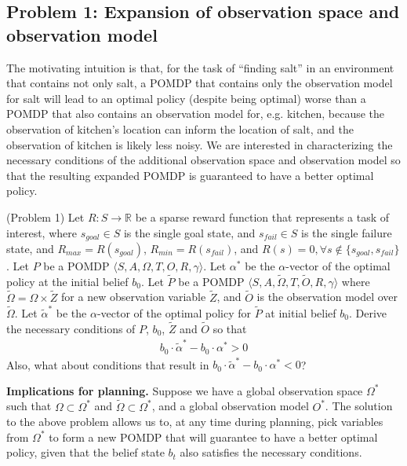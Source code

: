 \documentclass{article}
\newcommand{\td}[1]{\tilde{#1}}
\begin{document}
\subsection{Problem 1: Expansion of observation space and observation model}

The motivating intuition is that, for the task of ``finding salt'' in an environment that contains not only salt, a POMDP that contains only the observation model for salt will lead to an optimal policy (despite being optimal) worse than a POMDP that also contains an observation model for, e.g. kitchen, because the observation of kitchen's location can inform the location of salt, and the observation of kitchen is likely less noisy. We are interested in characterizing the necessary conditions of the additional observation space and observation model so that the resulting expanded POMDP is guaranteed to have a better optimal policy.

\begin{definition}(Problem 1)
Let $R:S\rightarrow \mathbb{R}$ be a sparse reward function that represents a task of interest, where $s_{goal}\in S$ is the single goal state, and $s_{fail}\in S$ is the single failure state, and $R_{max}=R(s_{goal})$, $R_{min}=R(s_{fail})$, and $R(s)=0, \forall s \not\in\{s_{goal},s_{fail}\}$. Let $P$ be a POMDP $\langle S, A, \Omega, T, O, R, \gamma  \rangle$. Let $\alpha^*$ be the $\alpha$-vector of the optimal policy at the initial belief $b_0$. Let $\td{P}$ be a POMDP $\langle S, A, \td{\Omega}, T, \td{O}, R, \gamma  \rangle$ where $\td{\Omega}=\Omega\times\td{Z}$ for a new observation variable $\td{Z}$, and $\td{O}$ is the observation model over $\td{\Omega}$. Let $\td{\alpha}^*$ be the $\alpha$-vector of the optimal policy for $\td{P}$ at initial belief $b_0$. Derive the necessary conditions of $P$, $b_0$, $\td{Z}$ and $\td{O}$ so that
\begin{align}
b_0\cdot \td{\alpha}^* - b_0\cdot \alpha^* > 0
\end{align}
Also, what about conditions that result in $b_0\cdot \td{\alpha}^* - b_0\cdot \alpha^* < 0$?
\end{definition}

\noindent \textbf{Implications for planning.} Suppose we have a global observation space $\Omega^*$ such that $\Omega \subset \Omega^*$ and $\td{\Omega} \subset \Omega^*$, and a global observation model $O^*$. The solution to the above problem allows us to, at any time during planning, pick variables from $\Omega^*$ to form a new POMDP that will guarantee to have a better optimal policy, given that the belief state $b_t$ also satisfies the necessary conditions.
\end{document}
